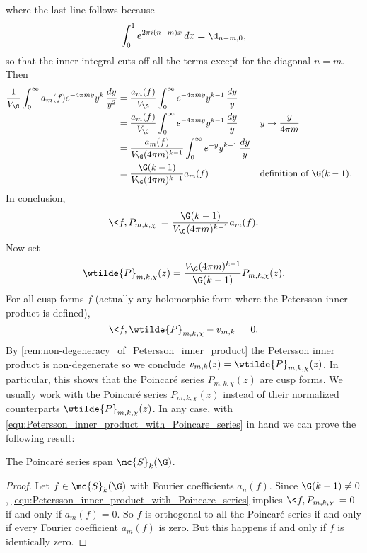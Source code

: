     where the last line follows because
    \begin{equation}\label{equ:Dirac_integral_representation}
      \int_{0}^{1}e^{2\pi i(n-m)x}\,dx = \d_{n-m,0},
    \end{equation}
    so that the inner integral cuts off all the terms except for the diagonal $n = m$. Then
    \begin{align*}
      \frac{1}{V_{\G}}\int_{0}^{\infty}a_{m}(f)e^{-4\pi my}y^{k}\,\frac{dy}{y^{2}} &= \frac{a_{m}(f)}{V_{\G}}\int_{0}^{\infty}e^{-4\pi my}y^{k-1}\,\frac{dy}{y} \\
      &= \frac{a_{m}(f)}{V_{\G}}\int_{0}^{\infty}e^{-4\pi my}y^{k-1}\,\frac{dy}{y} && \text{$y \to \frac{y}{4\pi m}$} \\
      &= \frac{a_{m}(f)}{V_{\G}(4\pi m)^{k-1}}\int_{0}^{\infty}e^{-y}y^{k-1}\,\frac{dy}{y} \\
      &= \frac{\G(k-1)}{V_{\G}(4\pi m)^{k-1}}a_{m}(f) && \text{definition of $\G(k-1)$.}
    \end{align*}
    In conclusion,
    \begin{equation}\label{equ:Petersson_inner_product_with_Poincare_series}
      \<f,P_{m,k,\chi}\> = \frac{\G(k-1)}{V_{\G}(4\pi m)^{k-1}}a_{m}(f).
    \end{equation}
    Now set
    \[
      \wtilde{P}_{m,k,\chi}(z) = \frac{V_{\G}(4\pi m)^{k-1}}{\G(k-1)}P_{m,k,\chi}(z).
    \]
    For all cusp forms $f$ (actually any holomorphic form where the Petersson inner product is defined),
    \[
      \<f,\wtilde{P}_{m,k,\chi}-v_{m,k}\> = 0.
    \]
    By \cref{rem:non-degeneracy_of_Petersson_inner_product} the Petersson inner product is non-degenerate so we conclude $v_{m,k}(z) = \wtilde{P}_{m,k,\chi}(z)$. In particular, this shows that the Poincar\'e series $P_{m,k,\chi}(z)$ are cusp forms. We usually work with the Poincar\'e series $P_{m,k,\chi}(z)$ instead of their normalized counterparts $\wtilde{P}_{m,k,\chi}(z)$. In any case, with \cref{equ:Petersson_inner_product_with_Poincare_series} in hand we can prove the following result:

    \begin{theorem}
      The Poincar\'e series span $\mc{S}_{k}(\G)$.
    \end{theorem}
    \begin{proof}
      Let $f \in \mc{S}_{k}(\G)$ with Fourier coefficients $a_{n}(f)$. Since $\G(k-1) \neq 0$, \cref{equ:Petersson_inner_product_with_Poincare_series} implies $\<f,P_{m,k,\chi}\> = 0$ if and only if $a_{m}(f) = 0$. So $f$ is orthogonal to all the Poincar\'e series if and only if every Fourier coefficient $a_{m}(f)$ is zero. But this happens if and only if $f$ is identically zero.
    \end{proof}
